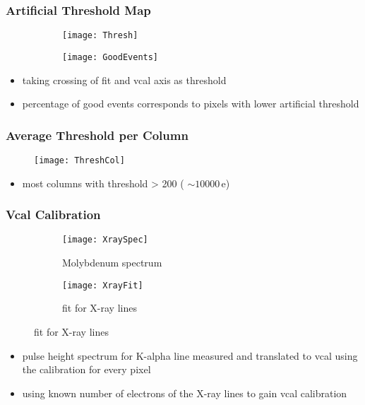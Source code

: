 \begin{frame}
	\frametitle{Artificial Threshold Map}
	\begin{figure} 
		\begin{center}
			\begin{subfigure}{0.45\textwidth}  
				\centering 
				\texttt{[image: Thresh]}
			\end{subfigure}
			\begin{subfigure}{0.45\textwidth} 
				\centering 
				\texttt{[image: GoodEvents]}
			\end{subfigure} 
		\end{center}
	\end{figure}
	\begin{itemize}
		\item taking crossing of fit and vcal axis as threshold
		\item percentage of good events corresponds to pixels with lower artificial threshold
	\end{itemize}
\end{frame}
\begin{frame}
	\frametitle{Average Threshold per Column}
	\begin{figure} 
		\centering 
		\texttt{[image: ThreshCol]}
	\end{figure}
	\begin{itemize}
		\item most columns with threshold > 200 ( $\sim 10000\,$e)
	\end{itemize}
\end{frame}
\begin{frame}
	\frametitle{Vcal Calibration}
	\begin{figure} 
		\begin{center}
			\begin{subfigure}{0.45\textwidth}  
				\centering 
				\texttt{[image: XraySpec]}
				\caption{Molybdenum spectrum}
			\end{subfigure}
			\begin{subfigure}{0.45\textwidth} 
				\centering 
				\texttt{[image: XrayFit]}
				\caption{fit for X-ray lines}
			\end{subfigure} 
		\end{center}
	\end{figure}
	\begin{itemize}
		\item pulse height spectrum for K-alpha line measured and translated to vcal using the calibration for every pixel
		\item using known number of electrons of the X-ray lines to gain vcal calibration
	\end{itemize}
\end{frame}

